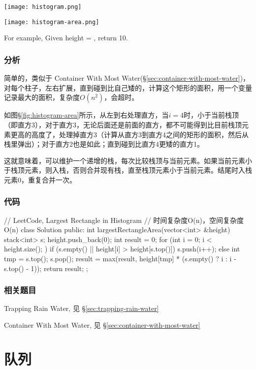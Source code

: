 \begin{center}
\texttt{[image: histogram.png]}\\
\label{fig:histogram}
\end{center}

\begin{center}
\texttt{[image: histogram-area.png]}\\
\label{fig:histogram-area}
\end{center}

For example,
Given height = \fn{[2,1,5,6,2,3]},
return 10.


\subsubsection{分析}
简单的，类似于 Container With Most Water(\S \ref{sec:container-with-most-water})，对每个柱子，左右扩展，直到碰到比自己矮的，计算这个矩形的面积，用一个变量记录最大的面积，复杂度$O(n^2)$，会超时。

如图\S \ref{fig:histogram-area}所示，从左到右处理直方，当$i=4$时，小于当前栈顶（即直方3），对于直方3，无论后面还是前面的直方，都不可能得到比目前栈顶元素更高的高度了，处理掉直方3（计算从直方3到直方4之间的矩形的面积，然后从栈里弹出）；对于直方2也是如此；直到碰到比直方4更矮的直方1。

这就意味着，可以维护一个递增的栈，每次比较栈顶与当前元素。如果当前元素小于栈顶元素，则入栈，否则合并现有栈，直至栈顶元素小于当前元素。结尾时入栈元素0，重复合并一次。


\subsubsection{代码}
\begin{Code}
// LeetCode, Largest Rectangle in Histogram
// 时间复杂度O(n)，空间复杂度O(n)
class Solution {
public:
    int largestRectangleArea(vector<int> &height) {
        stack<int> s;
        height.push_back(0);
        int result = 0;
        for (int i = 0; i < height.size(); ) {
            if (s.empty() || height[i] > height[s.top()])
                s.push(i++);
            else {
                int tmp = s.top();
                s.pop();
                result = max(result,
                        height[tmp] * (s.empty() ? i : i - s.top() - 1));
            }
        }
        return result;
    }
};
\end{Code}


\subsubsection{相关题目}
\begindot
\item Trapping Rain Water, 见 \S \ref{sec:trapping-rain-water}
\item Container With Most Water, 见 \S \ref{sec:container-with-most-water}
\myenddot


\section{队列} %

